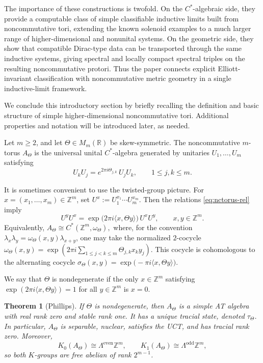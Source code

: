 \documentclass[11pt]{amsart}
\newtheorem{theorem}{Theorem}[section]
\theoremstyle{definition}
\theoremstyle{remark}
\newcommand{\Z}{\mathbb{Z}}
\newcommand{\R}{\mathbb{R}}
\begin{document}
The importance of these constructions is twofold.  On the $C^*$-algebraic
side, they provide a computable class of simple classifiable inductive limits
built from noncommutative tori, extending the known solenoid examples to a much
larger range of higher-dimensional and nonunital systems.  On the geometric
side, they show that compatible Dirac-type data can be transported through the
same inductive systems, giving spectral and locally compact spectral triples on
the resulting noncommutative protori.  Thus the paper connects explicit
Elliott-invariant classification with noncommutative metric geometry in a
single inductive-limit framework.

We conclude this introductory section by briefly recalling the definition and basic structure of simple higher-dimensional noncommutative tori. Additional properties and notation will be introduced later, as needed.

Let $m\geq 2$, and let $\Theta\in M_m(\R)$ be skew-symmetric. The
noncommutative $m$-torus $A_\Theta$ \cite{RieffelNC} is the universal
unital $C^*$-algebra generated by unitaries
$U_1,\dots,U_m$ satisfying
\begin{equation}\label{eq:nctorus-rel}
U_kU_j=e^{2\pi i\Theta_{j,k}}\,U_jU_k,
\qquad 1\leq j,k\leq m.
\end{equation}

It is sometimes convenient to use the twisted-group picture. For
$x=(x_1,\dots,x_m)\in\Z^m$, set $U^x:=U_1^{x_1}\cdots U_m^{x_m}.$
Then the relations \eqref{eq:nctorus-rel} imply
\begin{equation}\label{eq:ordered-commutator}
U^yU^x
=
\exp\bigl(2\pi i\langle x,\Theta y\rangle\bigr)\,U^xU^y,
\qquad x,y\in\Z^m.
\end{equation}
Equivalently, $A_\Theta\cong C^\ast(\Z^m,\omega_\Theta),$
where, for the convention
$\lambda_x\lambda_y=\omega_\Theta(x,y)\lambda_{x+y}$, one may take the
normalized $2$-cocycle
$\omega_\Theta(x,y)
=
\exp\left(
2\pi i\sum_{1\leq j<k\leq m}\Theta_{j,k}x_ky_j
\right).$
This cocycle is cohomologous to the alternating cocycle
$\sigma_\Theta(x,y)=\exp\bigl(-\pi i\langle x,\Theta y\rangle\bigr).$

We say that $\Theta$ is nondegenerate \cite{Slawny} if the only
$x\in\Z^m$ satisfying $\exp(2\pi i\langle x,\Theta y\rangle)=1$
for all $y\in\Z^m$
is $x=0$.

\begin{theorem}[Phillips]\label{thm:phillips}
If $\Theta$ is nondegenerate, then $A_\Theta$ is a simple AT algebra with
real rank zero and stable rank one. It has a unique tracial state, denoted
$\tau_\Theta$. In particular, $A_\Theta$ is separable, nuclear, satisfies
the UCT, and has tracial rank zero. Moreover,
\begin{equation}\label{eq:K-exterior}
K_0(A_\Theta)\cong \Lambda^{\mathrm{even}}\Z^m,
\qquad
K_1(A_\Theta)\cong \Lambda^{\mathrm{odd}}\Z^m,
\end{equation}
so both $K$-groups are free abelian of rank $2^{m-1}$.
\end{theorem}
\end{document}
